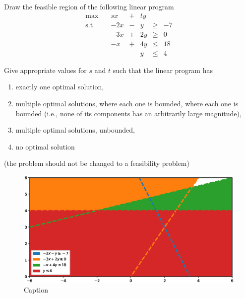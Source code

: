\documentclass{article}
\begin{document}
\newpage

\begin{exercise}
    Draw the feasible region of the following linear program
    \begin{align}
        \max \quad & sx & +& ty\\
        \text{s.t}& -2x&-& y &\geq & -7\\
        &-3x &+&2y &\geq &0\\
        &-x&+&4y&\leq &18\\
        &&&y&\leq &4
    \end{align}

Give appropriate values for $s$ and $t$ such that the linear program has \begin{enumerate}
    \item exactly one optimal solution,
    \item multiple optimal solutions, where each one is bounded, where each one is bounded (i.e., none of its components has an arbitrarily large magnitude),
    \item multiple optimal solutions, unbounded,
    \item no optimal solution
\end{enumerate}
(the problem should not be changed to a feasibility problem)
\end{exercise}
\begin{solving}
    \begin{figure}[H]
        \centering
        \includegraphics{5/exercise/quick.eps}
        \caption{Caption}
        \label{fig:my_label}
    \end{figure}
\end{solving}


\newpage
\end{document}
